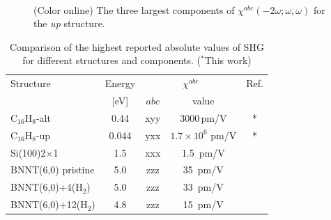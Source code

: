 \documentclass[pss]{wiley2sp} %
\begin{document}
\begin{figure}[t]
\\
\caption{(Color online) The three largest components of
$\chi^{abc}(-2\omega;\omega,\omega)$ for the \emph{up} structure.
\label{fig:shg-vnl-up}}
\end{figure}

\begin{table}[htb]%
\sidecaption
\begin{tabular}{lcccc}
\hline
\hline
Structure & \hspace{-5mm}Energy & \multicolumn{2}{c}{$\chi^{abc} $} &  Ref.\\
\cline{3-4} & \hspace{-5mm}[eV] & $abc$ & value \\
\hline
C$_{16}$H$_{8}$-alt   & \hspace{-5mm}0.44  & xyy   & 3000\,\scriptsize{pm/V}  & *     \\
C$_{16}$H$_{8}$-up    & \hspace{-5mm}0.044 & yxx   & $1.7\times10^{6}$ \scriptsize{pm/V}  & *     \\
Si(100)2$\times$1     & \hspace{-5mm}1.5   & xxx   & 1.5\, \scriptsize{pm/V}  & \cite{andersonPRB15}  \\
BNNT(6,0) pristine    & \hspace{-5mm}5.0   & zzz   & 35\,  \scriptsize{pm/V}  & \cite{salazarPRB14} \\
BNNT(6,0)+4(H$_{2}$)  & \hspace{-5mm}5.0   & zzz   & 33\,  \scriptsize{pm/V}  & \cite{salazarPRB14} \\
BNNT(6,0)+12(H$_{2}$) & \hspace{-5mm}4.8   & zzz   & 15\,  \scriptsize{pm/V}  & \cite{salazarPRB14} \\
\hline
\hline
\end{tabular}
\caption[]{%
Comparison of the highest reported absolute values of SHG for 
different structures and components. ($^{*}$This work)}
\label{tab:shgcomp}
\end{table}
\end{document}

